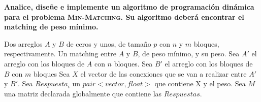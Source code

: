 \documentclass[12pt,a4,paper]{article}
\begin{document}
\textbf{Analice, diseñe e implemente un algoritmo de programaci\'on din\'amica para el problema \textsc{Min-Matching}. Su algoritmo deber\'a encontrar el matching de peso m\'inimo.}\\

\begin{algorithmic}[1]
    \REQUIRE Dos arreglos $A$ y $B$ de ceros y unos, de tamaño $p$ con $n$ y $m$ bloques, respectivamente.
    \ENSURE Un matching entre $A$ y $B$, de peso mínimo, y su peso. \newline \newline
        \STATE Sea $A'$ el arreglo con los bloques de $A$ con $n$ bloques.
        \STATE Sea $B'$ el arreglo con los bloques de $B$ con $m$ bloques
        \STATE Sea $X$ el vector de las conexiones que se van a realizar entre $A'$ y $B'$.
        \STATE Sea $Respuesta_i$ un $pair<vector, float>$ que contiene X y el peso.
        \STATE Sea $M$ una matriz declarada globalmente que contiene las $Respuestas$.
        \ENDFOR
        \STATE
        \ENDFOR
        \STATE
        \STATE
        \STATE
        \STATE
                    \ENDFOR

\end{algorithmic}
\end{document}
